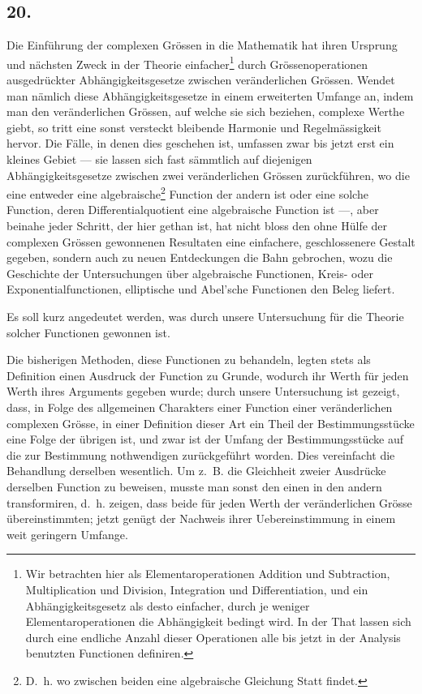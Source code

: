 \documentclass[12pt,a4paper]{article}
\begin{document}
\subsection*{20.}

Die Einführung der complexen Grössen in die Mathematik hat ihren Ursprung und nächsten Zweck in der Theorie einfacher\footnote{Wir betrachten hier als Elementaroperationen Addition und Subtraction, Multiplication und Division, Integration und Differentiation, und ein Abhängigkeitsgesetz als desto einfacher, durch je weniger Elementaroperationen die Abhängigkeit bedingt wird. In der That lassen sich durch eine endliche Anzahl dieser Operationen alle bis jetzt in der Analysis benutzten Functionen definiren.} durch Grössenoperationen ausgedrückter Abhängigkeitsgesetze zwischen veränderlichen Grössen. Wendet man nämlich diese Abhängigkeitsgesetze in einem erweiterten Umfange an, indem man den veränderlichen Grössen, auf welche sie sich beziehen, complexe Werthe giebt, so tritt eine sonst versteckt bleibende Harmonie und Regelmässigkeit hervor. Die Fälle, in denen dies geschehen ist, umfassen zwar bis jetzt erst ein kleines Gebiet --- sie lassen sich fast sämmtlich auf diejenigen Abhängigkeitsgesetze zwischen zwei veränderlichen Grössen zurückführen, wo die eine entweder eine algebraische\footnote{D.~h. wo zwischen beiden eine algebraische Gleichung Statt findet.} Function der andern ist oder eine solche Function, deren Differentialquotient eine algebraische Function ist ---, aber beinahe jeder Schritt, der hier gethan ist, hat nicht bloss den ohne Hülfe der complexen Grössen gewonnenen Resultaten eine einfachere, geschlossenere Gestalt gegeben, sondern auch zu neuen Entdeckungen die Bahn gebrochen, wozu die Geschichte der Untersuchungen über algebraische Functionen, Kreis- oder Exponentialfunctionen, elliptische und Abel'sche Functionen den Beleg liefert.

Es soll kurz angedeutet werden, was durch unsere Untersuchung für die Theorie solcher Functionen gewonnen ist.

Die bisherigen Methoden, diese Functionen zu behandeln, legten stets als Definition einen Ausdruck der Function zu Grunde, wodurch ihr Werth für jeden Werth ihres Arguments gegeben wurde; durch unsere Untersuchung ist gezeigt, dass, in Folge des allgemeinen Charakters einer Function einer veränderlichen complexen Grösse, in einer Definition dieser Art ein Theil der Bestimmungsstücke eine Folge der übrigen ist, und zwar ist der Umfang der Bestimmungsstücke auf die zur Bestimmung nothwendigen zurückgeführt worden. Dies vereinfacht die Behandlung derselben wesentlich. Um z.~B. die Gleichheit zweier Ausdrücke derselben Function zu beweisen, musste man sonst den einen in den andern transformiren, d.~h. zeigen, dass beide für jeden Werth der veränderlichen Grösse übereinstimmten; jetzt genügt der Nachweis ihrer Uebereinstimmung in einem weit geringern Umfange.
\end{document}
